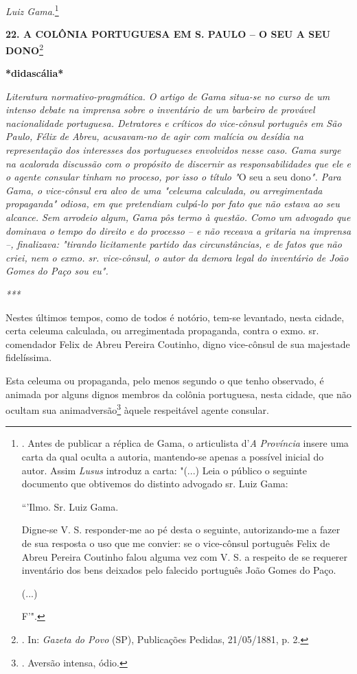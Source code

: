 \emph{Luiz Gama}.\footnote{. Antes de publicar a réplica de Gama, o
  articulista d'\emph{A} \emph{Província} insere uma carta da qual
  oculta a autoria, mantendo-se apenas a possível inicial do autor.
  Assim \emph{Lusus} introduz a carta: "(...) Leia o público o seguinte
  documento que obtivemos do distinto advogado sr. Luiz Gama:

  ``'Ilmo. Sr. Luiz Gama.

  Digne-se V. S. responder-me ao pé desta o seguinte, autorizando-me a
  fazer de sua resposta o uso que me convier: se o vice-cônsul português
  Felix de Abreu Pereira Coutinho falou alguma vez com V. S. a respeito
  de se requerer inventário dos bens deixados pelo falecido português
  João Gomes do Paço.

  (...)

  F'".}

\textbf{22. A COLÔNIA PORTUGUESA EM S. PAULO -- O SEU A SEU
DONO}\footnote{. In: \emph{Gazeta do Povo} (SP), Publicações Pedidas,
  21/05/1881, p. 2.}

\textbf{*didascália*}

\emph{Literatura normativo-pragmática. O artigo de Gama situa-se no
curso de um intenso debate na imprensa sobre o inventário de um barbeiro
de provável nacionalidade portuguesa. Detratores e críticos do
vice-cônsul português em São Paulo, Félix de Abreu, acusavam-no de agir
com malícia ou desídia na representação dos interesses dos portugueses
envolvidos nesse caso. Gama surge na acalorada discussão com o propósito
de discernir as responsabilidades que ele e o agente consular tinham no
proceso, por isso o título "}O seu a seu dono\emph{". Para Gama, o
vice-cônsul era alvo de uma "celeuma calculada, ou arregimentada
propaganda" odiosa, em que pretendiam culpá-lo por fato que não estava
ao seu alcance. Sem arrodeio algum, Gama pôs termo à questão. Como um
advogado que dominava o tempo do direito e do processo -- e não receava
a gritaria na imprensa --, finalizava: "tirando licitamente partido das
circunstâncias, e de fatos que não criei, nem o exmo. sr. vice-cônsul, o
autor da demora legal do inventário de João Gomes do Paço sou eu". }

\emph{***}

Nestes últimos tempos, como de todos é notório, tem-se levantado, nesta
cidade, certa celeuma calculada, ou arregimentada propaganda, contra o
exmo. sr. comendador Felix de Abreu Pereira Coutinho, digno vice-cônsul
de sua majestade fidelíssima.

Esta celeuma ou propaganda, pelo menos segundo o que tenho observado, é
animada por alguns dignos membros da colônia portuguesa, nesta cidade,
que não ocultam sua animadversão\footnote{. Aversão intensa, ódio.}
àquele respeitável agente consular.

